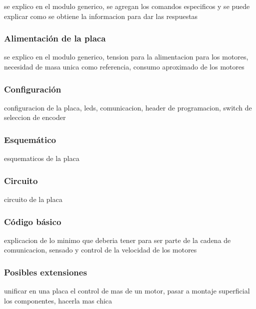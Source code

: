 se explico en el modulo generico, se agregan los comandos especificos y se puede explicar como se obtiene la informacion para dar las respuestas

\subsubsection{Alimentaci\'on de la placa}
\label{h_placas_motorDC_alimentacion}

se explico en el modulo generico, tension para la alimentacion para los motores, necesidad de masa unica como referencia, consumo aproximado de los motores

\subsubsection{Configuraci\'on}
\label{h_placas_motorDC_config}

configuracion de la placa, leds, comunicacion, header de programacion, switch de seleccion de encoder

\subsubsection{Esquem\'atico}
\label{h_placas_motorDC_esquematico}

esquematicos de la placa

\subsubsection{Circuito}
\label{h_placas_motorDC_circuito}

circuito de la placa

\subsubsection{C\'odigo b\'asico}
\label{h_placas_motorDC_codigo}

explicacion de lo minimo que deberia tener para ser parte de la cadena de comunicacion, sensado y control de la velocidad de los motores

\subsubsection{Posibles extensiones}
\label{h_placas_motorDC_extensiones}

unificar en una placa el control de mas de un motor, pasar a montaje superficial los componentes, hacerla mas chica

